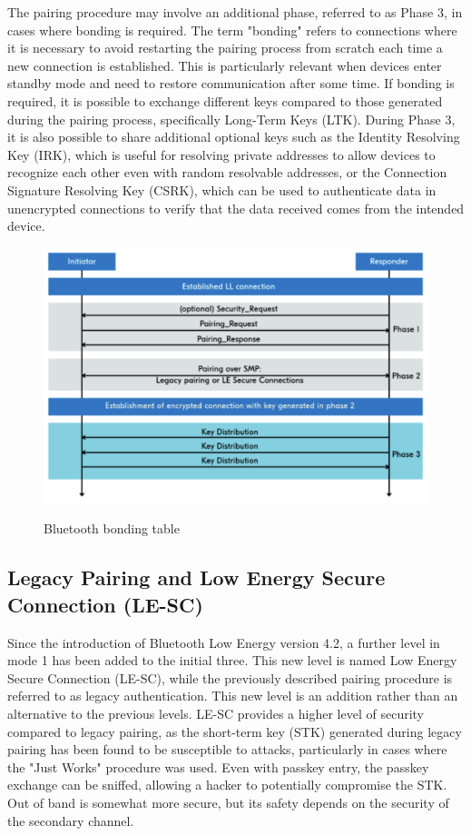 \documentclass{Configuration_Files/PoliMi3i_thesis}
\begin{document}
The pairing procedure may involve an additional phase, referred to as Phase 3, in cases where bonding is required. The term "bonding" refers to connections where it is necessary to avoid restarting the pairing process from scratch each time a new connection is established. This is particularly relevant when devices enter standby mode and need to restore communication after some time. If bonding is required, it is possible to exchange different keys compared to those generated during the pairing process, specifically Long-Term Keys (LTK). During Phase 3, it is also possible to share additional optional keys such as the Identity Resolving Key (IRK), which is useful for resolving private addresses to allow devices to recognize each other even with random resolvable addresses, or the Connection Signature Resolving Key (CSRK), which can be used to authenticate data in unencrypted connections to verify that the data received comes from the intended device. 

\begin{figure}[h]
\centering
\includegraphics[scale=0.7]{Bluetooth_Security/4.png}
\label{bluetooth_sec_4}
\caption{Bluetooth bonding table}
\end{figure}

\subsection{Legacy Pairing and Low Energy Secure Connection (LE-SC)}

Since the introduction of Bluetooth Low Energy version 4.2, a further level in mode 1 has been added to the initial three. This new level is named Low Energy Secure Connection (LE-SC), while the previously described pairing procedure is referred to as legacy authentication. This new level is an addition rather than an alternative to the previous levels. LE-SC provides a higher level of security compared to legacy pairing, as the short-term key (STK) generated during legacy pairing has been found to be susceptible to attacks, particularly in cases where the "Just Works" procedure was used. Even with passkey entry, the passkey exchange can be sniffed, allowing a hacker to potentially compromise the STK. Out of band is somewhat more secure, but its safety depends on the security of the secondary channel.
\end{document}
